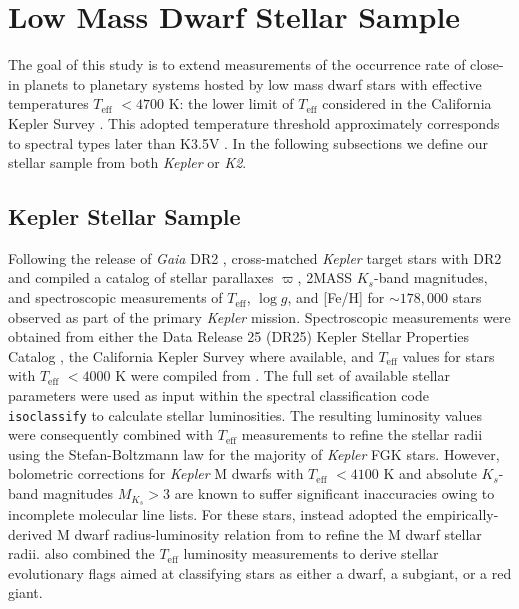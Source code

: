 \documentclass[twocolumn]{emulateapj}
\newcommand{\gaia}[1]{\emph{Gaia}#1}
\newcommand{\kepler}[1]{\emph{Kepler}#1}
\newcommand{\ktwo}[1]{\emph{K2}#1}
\newcommand{\teff}[1]{$T_{\text{eff}}$#1}
\newcommand{\logg}[1]{$\log{g}$#1}
\begin{document}
\section{Low Mass Dwarf Stellar Sample} \label{sect:stars}
The goal of this study is to extend measurements of the occurrence rate of close-in planets to planetary systems hosted
by low mass dwarf stars with effective temperatures \teff{} $<4700$ K: the lower limit of \teff{}
considered in the California Kepler Survey \citep[CKS;][]{fulton17}.
This adopted temperature threshold approximately corresponds to spectral types later than
K3.5V \citep{pecaut13}. In the following subsections we define our stellar sample from both \kepler{} or \ktwo{.}

\subsection{Kepler Stellar Sample} \label{sect:kep}
Following the release of \gaia{} DR2 \citep{lindegren18}, \cite{berger18} cross-matched \kepler{} target stars
with DR2 and compiled a catalog of stellar
parallaxes $\varpi$, 2MASS $K_s$-band magnitudes, and spectroscopic measurements of \teff{,} \logg{,} and [Fe/H]
for $\sim 178,000$ stars observed as part of the primary \kepler{} mission. Spectroscopic measurements were obtained from
either the Data Release 25 (DR25)
Kepler Stellar Properties Catalog \citep[KSPC;][]{mathur17}, the California
Kepler Survey \citep[CKS;][]{petigura17} where available, and \teff{} values for stars with \teff{} $<4000$ K were compiled from
\cite{gaidos16}. The full set of available stellar parameters were used as input within the spectral classification code
\texttt{isoclassify} \citep{huber17} to calculate stellar luminosities. The resulting luminosity values were consequently combined
with \teff{} measurements to refine the stellar radii using the Stefan-Boltzmann law for the majority of \kepler{} FGK stars.
However, bolometric corrections for \kepler{} M dwarfs with \teff{} $<4100$ K
and absolute $K_s$-band magnitudes $M_{K_s}>3$ are known to suffer significant inaccuracies owing to incomplete
molecular line lists. For these stars, \cite{berger18} instead adopted the empirically-derived M dwarf radius-luminosity
relation from \cite{mann15} to refine the M dwarf stellar radii. \cite{berger18} also combined the \teff{} 
luminosity measurements to derive stellar evolutionary flags aimed at classifying stars as either a dwarf, a subgiant, or a
red giant.
\end{document}
